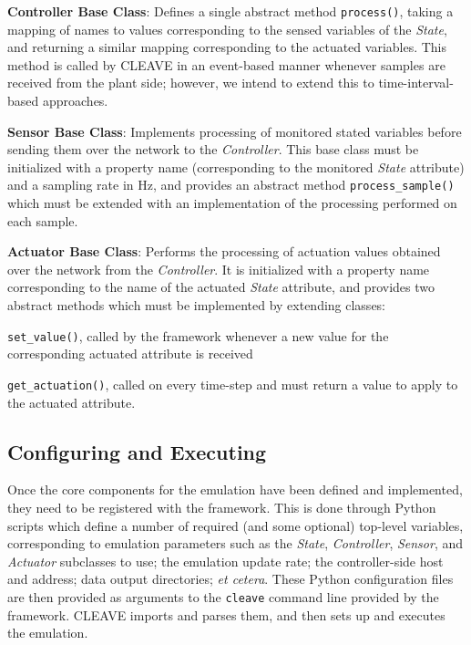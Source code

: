 
\textbf{Controller Base Class}:
Defines a single abstract method \texttt{process()}, taking a mapping of names to values corresponding to the sensed variables of the \emph{State}, and returning a similar mapping corresponding to the actuated variables.
This method is called by \ac{CLEAVE} in an event-based manner whenever samples are received from the plant side; however, we intend to extend this to time-interval-based approaches.

\textbf{Sensor Base Class}:
Implements processing of monitored stated variables before sending them over the network to the \emph{Controller}.
This base class must be initialized with a property name (corresponding to the monitored \emph{State} attribute) and a sampling rate in \si{\hertz}, and provides an abstract method \texttt{process_sample()} which must be extended with an implementation of the processing performed on each sample.

\textbf{Actuator Base Class}:
Performs the processing of actuation values obtained over the network from the \emph{Controller}.
It is initialized with a property name corresponding to the name of the actuated \emph{State} attribute, and provides two abstract methods which must be implemented by extending classes:
\begin{enumerate*}[itemjoin={{; }}, itemjoin*={{; and }}]
\item \texttt{set_value()}, called by the framework whenever a new value for the corresponding actuated attribute is received
\item \texttt{get_actuation()}, called on every time-step and must return a value to apply to the actuated attribute.
\end{enumerate*}


\subsection{Configuring and Executing }

Once the core components for the emulation have been defined and implemented, they need to be registered with the framework.
This is done through Python scripts which define a number of required (and some optional) top-level variables, corresponding to emulation parameters such as the \emph{State}, \emph{Controller}, \emph{Sensor}, and \emph{Actuator} subclasses to use; the emulation update rate; the controller-side host and address; data output directories; \emph{et cetera}.
These Python configuration files are then provided as arguments to the \texttt{cleave} command line provided by the framework.
\ac{CLEAVE} imports and parses them, and then sets up and executes the emulation.

